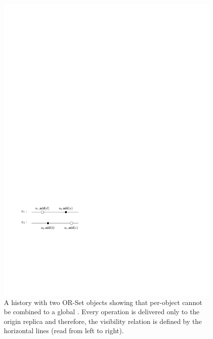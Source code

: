\begin{figure}[t]
  \centering
  \includegraphics[width=0.35 \textwidth]{figures/TwoSubLin-NotaGlobalLin.pdf}
  \caption{A history with two OR-Set objects showing that per-object  cannot be combined to a global \crdtlinearization{}. Every operation is delivered only to the origin replica and therefore, the visibility relation is defined by the horizontal lines (read from left to right).}
  \label{fig:negative_composition}
\end{figure}

